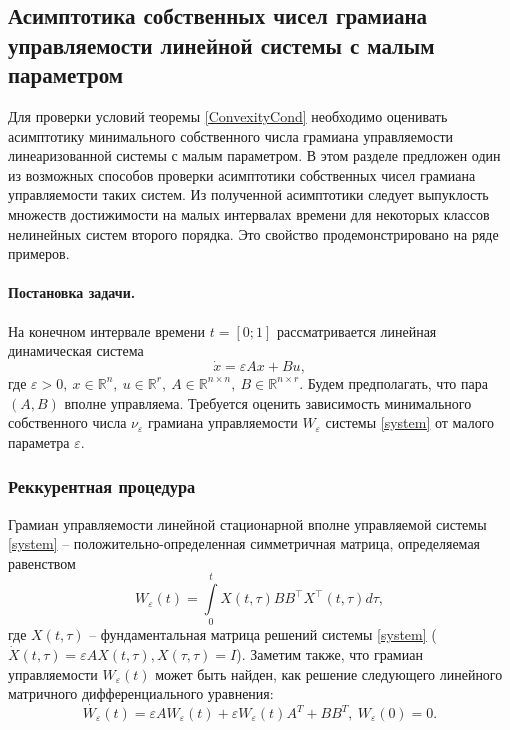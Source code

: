 \documentclass[../main.tex]{subfiles}
\begin{document}
\newpage
\subsection{Асимптотика собственных чисел грамиана управляемости линейной системы с малым параметром} 
Для проверки условий теоремы \ref{ConvexityCond} необходимо оценивать асимптотику минимального собственного числа грамиана управляемости линеаризованной системы с малым параметром. В этом разделе предложен один из возможных способов проверки асимптотики собственных чисел грамиана управляемости таких систем. Из полученной асимптотики следует выпуклость множеств достижимости на малых интервалах времени для некоторых классов нелинейных систем второго порядка. Это свойство продемонстрировано на ряде примеров.
\paragraph{Постановка задачи.} На конечном интервале времени $ t = [0;1] $ рассматривается линейная динамическая система 
\begin{equation}\label{system}
	\dot{x} = \varepsilon A x + Bu, 
\end{equation}
где $ \varepsilon > 0, \ x \in \mathbb{R}^n, \ u \in \mathbb{R}^r, \ A \in \mathbb{R}^{n\times n}, \ B \in \mathbb{R}^{n\times r}  $. Будем предполагать, что пара $ \left( A, B\right)  $ вполне управляема. Требуется оценить зависимость минимального собственного числа $ \nu_{\varepsilon} $ грамиана управляемости $ W_{\varepsilon} $ системы \eqref{system} от малого параметра $ \varepsilon  $.
\subsubsection{Реккурентная процедура}
Грамиан управляемости линейной стационарной вполне управляемой системы \eqref{system} -- положительно-определенная симметричная матрица, определяемая равенством
\begin{equation*}
	W_{\varepsilon}(t) = \int \limits_0^t X(t,\tau) B B^{\top} X^{\top}(t,\tau) d\tau,
\end{equation*}
где $ X(t,\tau) $ -- фундаментальная матрица решений системы \eqref{system} ($  \dot{X}(t,\tau) = \varepsilon A X(t,\tau), X(\tau,\tau) = I  $).
Заметим также, что грамиан управляемости $ W_{\varepsilon}(t) $ может быть найден, как решение следующего линейного матричного дифференциального уравнения:
\begin{equation}\label{gram}
	\dot{W_{\varepsilon}}(t) = \varepsilon A W_{\varepsilon}(t) + \varepsilon W_{\varepsilon}(t) A^T + BB^T, \ W_{\varepsilon}(0) = 0.
\end{equation}
\end{document}
